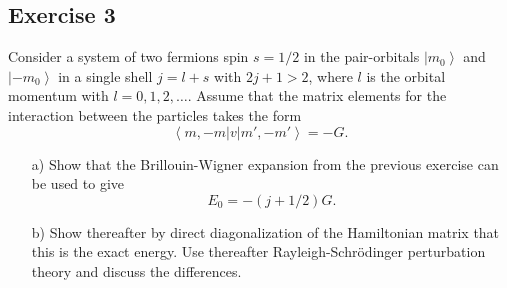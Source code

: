 \documentclass[prc]{revtex4}
\newcommand{\bra}[1]{\left\langle #1 \right|}
\newcommand{\ket}[1]{\left| #1 \right\rangle}
\begin{document}
\subsection*{Exercise 3}
Consider a system of two fermions spin $s=1/2$ in the pair-orbitals
$\ket{m_0}$ and $\ket{-m_0}$ in a single shell $j=l+s$ with $2j+1>2$, where $l$ is the orbital momentum with $l=0,1,2,\dots$.
Assume that the matrix elements for the interaction between the particles
takes the form
\[
\bra{m,-m}v\ket{m',-m'}=-G.
\]
\begin{enumerate}
\item[a)]
Show that the Brillouin-Wigner expansion from the previous exercise can be used
to give
\[
E_0=-(j+1/2)G.
\]
\item[b)] Show thereafter by direct diagonalization of the  Hamiltonian
matrix that this is the exact energy. Use thereafter 
Rayleigh-Schr\"{o}dinger perturbation theory and discuss the differences.
\end{enumerate}
\end{document}
